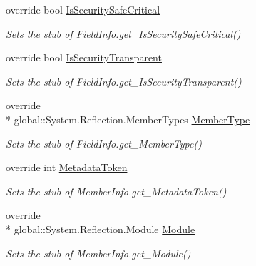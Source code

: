 \begin{DoxyCompactItemize}
override bool \hyperlink{class_system_1_1_reflection_1_1_fakes_1_1_stub_field_info_a074da3c79e5a57b25aa28ca1ae13b5a8}{Is\-Security\-Safe\-Critical}
\begin{DoxyCompactList}\small\item\em Sets the stub of Field\-Info.\-get\-\_\-\-Is\-Security\-Safe\-Critical()\end{DoxyCompactList}\item 
override bool \hyperlink{class_system_1_1_reflection_1_1_fakes_1_1_stub_field_info_a298ab20599289ce2339283a1916a164b}{Is\-Security\-Transparent}
\begin{DoxyCompactList}\small\item\em Sets the stub of Field\-Info.\-get\-\_\-\-Is\-Security\-Transparent()\end{DoxyCompactList}\item 
override \\*
global\-::\-System.\-Reflection.\-Member\-Types \hyperlink{class_system_1_1_reflection_1_1_fakes_1_1_stub_field_info_ab8fe324b67cac4232f27bc51886dcefe}{Member\-Type}
\begin{DoxyCompactList}\small\item\em Sets the stub of Field\-Info.\-get\-\_\-\-Member\-Type()\end{DoxyCompactList}\item 
override int \hyperlink{class_system_1_1_reflection_1_1_fakes_1_1_stub_field_info_aaa049812925b6758be968d466a9db844}{Metadata\-Token}
\begin{DoxyCompactList}\small\item\em Sets the stub of Member\-Info.\-get\-\_\-\-Metadata\-Token()\end{DoxyCompactList}\item 
override \\*
global\-::\-System.\-Reflection.\-Module \hyperlink{class_system_1_1_reflection_1_1_fakes_1_1_stub_field_info_a51988f08e49b1049609685373dd2ec0f}{Module}
\begin{DoxyCompactList}\small\item\em Sets the stub of Member\-Info.\-get\-\_\-\-Module()\end{DoxyCompactList}\item 

\end{DoxyCompactItemize}
